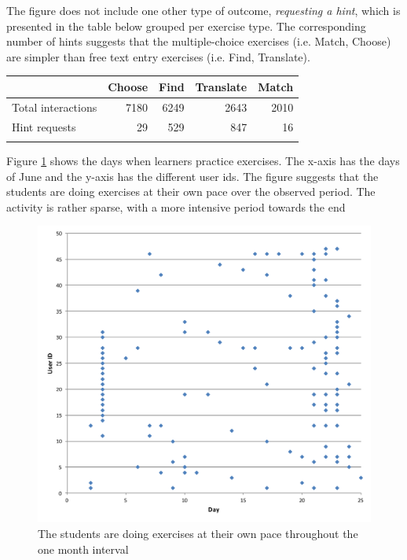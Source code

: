 The figure does not include one other type of outcome, {\em requesting a hint}, which is presented in the table below grouped per exercise type. The corresponding number of hints suggests that the multiple-choice exercises (i.e. Match, Choose) are simpler than free text entry exercises (i.e. Find, Translate).

\begin{tabular}{lrrrr}
                      & Choose  & Find & Translate & Match \\ \hline
  Total interactions  & 7180    & 6249 & 2643      & 2010\\
  Hint requests       & 29      & 529  & 847       & 16 \\ \hline
  \label{tab:hints_per_ex_type}
\end{tabular}

Figure \ref{fig:activity_per_day} shows the days when learners practice exercises. The x-axis has the days of June and the y-axis has the different user ids. The figure suggests that the students are doing exercises at their own pace over the observed period. The activity is rather sparse, with a more intensive period towards the end 

  \begin{figure}[h!]
  \centering
    \includegraphics[width=0.7\columnwidth]{figures/user_exercise_activity_vs_day.pdf}
    \caption{The students are doing exercises at their own pace throughout the one month interval }
    \label{fig:activity_per_day}
  \end{figure}






